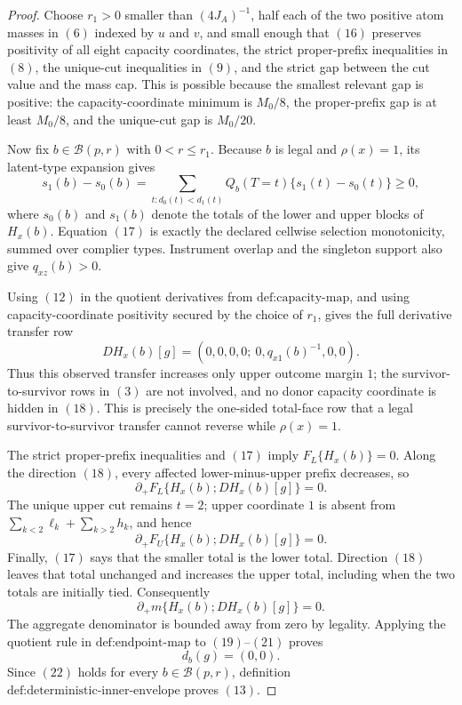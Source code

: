 \documentclass{article}
\begin{document}
\begin{proof}
Choose \(r_1>0\) smaller than \((4J_A)^{-1}\), half each of the two positive atom masses in \((6)\) indexed by \(u\) and \(v\), and small enough that \((16)\) preserves positivity of all eight capacity coordinates, the strict proper-prefix inequalities in \((8)\), the unique-cut inequalities in \((9)\), and the strict gap between the cut value and the mass cap.  This is possible because the smallest relevant gap is positive: the capacity-coordinate minimum is \(M_0/8\), the proper-prefix gap is at least \(M_0/8\), and the unique-cut gap is \(M_0/20\).

Now fix \(b\in\mathcal B(p,r)\) with \(0<r\le r_1\).  Because \(b\) is legal and \(\rho(x)=1\), its latent-type expansion gives
\[
 s_1(b)-s_0(b)
 =\sum_{t:d_0(t)<d_1(t)}Q_b(T=t)\{s_1(t)-s_0(t)\}\ge0,
\tag{17}
\]
where \(s_0(b)\) and \(s_1(b)\) denote the totals of the lower and upper blocks of \(H_x(b)\).  Equation \((17)\) is exactly the declared cellwise selection monotonicity, summed over complier types.  Instrument overlap and the singleton support also give \(q_{xz}(b)>0\).

Using \((12)\) in the quotient derivatives from \(\text{def:capacity-map}\), and using capacity-coordinate positivity secured by the choice of \(r_1\), gives the full derivative transfer row
\[
 D H_x(b)[g]
 =\left(0,0,0,0;\ 0,q_{x1}(b)^{-1},0,0\right).
\tag{18}
\]
Thus this observed transfer increases only upper outcome margin \(1\); the survivor-to-survivor rows in \((3)\) are not involved, and no donor capacity coordinate is hidden in \((18)\).  This is precisely the one-sided total-face row that a legal survivor-to-survivor transfer cannot reverse while \(\rho(x)=1\).

The strict proper-prefix inequalities and \((17)\) imply \(F_L\{H_x(b)\}=0\).  Along the direction \((18)\), every affected lower-minus-upper prefix decreases, so
\[
 \partial_+F_L\{H_x(b);D H_x(b)[g]\}=0.
\tag{19}
\]
The unique upper cut remains \(t=2\); upper coordinate \(1\) is absent from
\(\sum_{k<2}\ell_k+\sum_{k>2}h_k\), and hence
\[
 \partial_+F_U\{H_x(b);D H_x(b)[g]\}=0.
\tag{20}
\]
Finally, \((17)\) says that the smaller total is the lower total.  Direction \((18)\) leaves that total unchanged and increases the upper total, including when the two totals are initially tied.  Consequently
\[
 \partial_+m\{H_x(b);D H_x(b)[g]\}=0.
\tag{21}
\]
The aggregate denominator is bounded away from zero by legality.  Applying the quotient rule in \(\text{def:endpoint-map}\) to \((19)\)--\((21)\) proves
\[
 d_b(g)=(0,0).
\tag{22}
\]
Since \((22)\) holds for every \(b\in\mathcal B(p,r)\), definition \(\text{def:deterministic-inner-envelope}\) proves \((13)\).


\end{proof}
\end{document}
